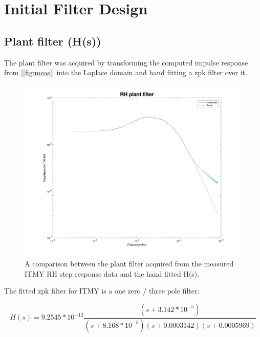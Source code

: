 \documentclass[colorlinks=true,pdfstartview=FitV,linkcolor=blue,
            citecolor=magenta,urlcolor=red]{ligodoc}
\begin{document}
\section{Initial Filter Design}
\subsection{Plant filter (H(s))}

The plant filter was acquired by transforming the computed impulse response from [\ref{fig:meas}] into the Laplace domain and hand fitting a zpk filter over it.

\begin{figure}[H]
\includegraphics[page=2,width=\textwidth]{figures/matlab/plant_filter.png}
\caption{A comparison between the plant filter acquired from the measured ITMY RH step response data and the hand fitted H(s).}
\label{fig:plantfilt}
\end{figure}

The fitted zpk filter for ITMY is a one zero / three pole filter:


$$ H(s) = 9.2545*10^{-12} \frac{(s+3.142*10^{-5})}{(s+ 8.168*10^{-5}) (s+0.0003142) (s+0.0005969)} $$
\end{document}
